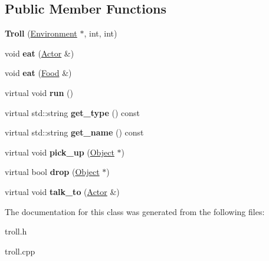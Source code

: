 \subsection*{Public Member Functions}
\begin{DoxyCompactItemize}
\item 
\hypertarget{classda__game_1_1Troll_a7b6cee5ab1339572982aa4f490b09b65}{
{\bfseries Troll} (\hyperlink{classda__game_1_1Environment}{Environment} $\ast$, int, int)}
\label{classda__game_1_1Troll_a7b6cee5ab1339572982aa4f490b09b65}

\item 
\hypertarget{classda__game_1_1Troll_a5ff7be42450036dee76060892ed52dd6}{
void {\bfseries eat} (\hyperlink{classda__game_1_1Actor}{Actor} \&)}
\label{classda__game_1_1Troll_a5ff7be42450036dee76060892ed52dd6}

\item 
\hypertarget{classda__game_1_1Troll_a50a5ca63166711c2ce631c6ec5cd2cad}{
void {\bfseries eat} (\hyperlink{classda__game_1_1Food}{Food} \&)}
\label{classda__game_1_1Troll_a50a5ca63166711c2ce631c6ec5cd2cad}

\item 
\hypertarget{classda__game_1_1Troll_a52d102598f13c6dea7311cc16d8bbc50}{
virtual void {\bfseries run} ()}
\label{classda__game_1_1Troll_a52d102598f13c6dea7311cc16d8bbc50}

\item 
\hypertarget{classda__game_1_1Troll_ac00b5c9350f950390cef9fcb365fd4e2}{
virtual std::string {\bfseries get\_\-type} () const }
\label{classda__game_1_1Troll_ac00b5c9350f950390cef9fcb365fd4e2}

\item 
\hypertarget{classda__game_1_1Troll_a1cedb77ac8a2c55cfec57fa26c8cd5a3}{
virtual std::string {\bfseries get\_\-name} () const }
\label{classda__game_1_1Troll_a1cedb77ac8a2c55cfec57fa26c8cd5a3}

\item 
\hypertarget{classda__game_1_1Troll_ad88f60e1b35cafe7652462c63e0747c7}{
virtual void {\bfseries pick\_\-up} (\hyperlink{classda__game_1_1Object}{Object} $\ast$)}
\label{classda__game_1_1Troll_ad88f60e1b35cafe7652462c63e0747c7}

\item 
\hypertarget{classda__game_1_1Troll_a263bc077ba47e77a5811fccf9cd34be6}{
virtual bool {\bfseries drop} (\hyperlink{classda__game_1_1Object}{Object} $\ast$)}
\label{classda__game_1_1Troll_a263bc077ba47e77a5811fccf9cd34be6}

\item 
\hypertarget{classda__game_1_1Troll_af44fd0a347a5a4fd6458f2a7768d887a}{
virtual void {\bfseries talk\_\-to} (\hyperlink{classda__game_1_1Actor}{Actor} \&)}
\label{classda__game_1_1Troll_af44fd0a347a5a4fd6458f2a7768d887a}

\end{DoxyCompactItemize}


The documentation for this class was generated from the following files:\begin{DoxyCompactItemize}
\item 
troll.h\item 
troll.cpp\end{DoxyCompactItemize}
